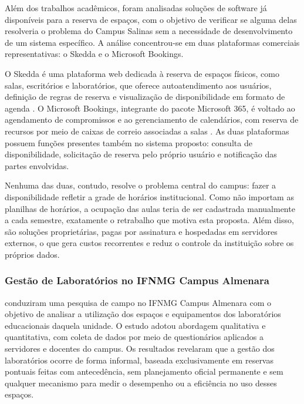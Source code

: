 \documentclass[
	12pt,				%
	twoside,			%
	openany,			%
	a4paper,			%
	chapter=TITLE,		%
	section=TITLE,		%
	subsection=TITLE,	%
	subsubsection=TITLE,%
	english,			%
	french,				%
	spanish,			%
	brazil,				%
	]{abntex2}
\begin{document}
Além dos trabalhos acadêmicos, foram analisadas soluções de software já disponíveis para a reserva de espaços, com o objetivo de verificar se alguma delas resolveria o problema do Campus Salinas sem a necessidade de desenvolvimento de um sistema específico. A análise concentrou-se em duas plataformas comerciais representativas: o Skedda e o Microsoft Bookings.

O Skedda é uma plataforma web dedicada à reserva de espaços físicos, como salas, escritórios e laboratórios, que oferece autoatendimento aos usuários, definição de regras de reserva e visualização de disponibilidade em formato de agenda \cite{skedda2025}. O Microsoft Bookings, integrante do pacote Microsoft 365, é voltado ao agendamento de compromissos e ao gerenciamento de calendários, com reserva de recursos por meio de caixas de correio associadas a salas \cite{microsoft2025bookings}. As duas plataformas possuem funções presentes também no sistema proposto: consulta de disponibilidade, solicitação de reserva pelo próprio usuário e notificação das partes envolvidas.

Nenhuma das duas, contudo, resolve o problema central do campus: fazer a disponibilidade refletir a grade de horários institucional. Como não importam as planilhas de horários, a ocupação das aulas teria de ser cadastrada manualmente a cada semestre, exatamente o retrabalho que motiva esta proposta. Além disso, são soluções proprietárias, pagas por assinatura e hospedadas em servidores externos, o que gera custos recorrentes e reduz o controle da instituição sobre os próprios dados.

\subsubsection{Gestão de Laboratórios no IFNMG Campus Almenara}
\label{sec:relcaio1}

 conduziram uma pesquisa de campo no IFNMG Campus Almenara com o objetivo de analisar a utilização dos espaços e equipamentos dos laboratórios educacionais daquela unidade. O estudo adotou abordagem qualitativa e quantitativa, com coleta de dados por meio de questionários aplicados a servidores e docentes do campus. Os resultados revelaram que a gestão dos laboratórios ocorre de forma informal, baseada exclusivamente em reservas pontuais feitas com antecedência, sem planejamento oficial permanente e sem qualquer mecanismo para medir o desempenho ou a eficiência no uso desses espaços.
\end{document}
